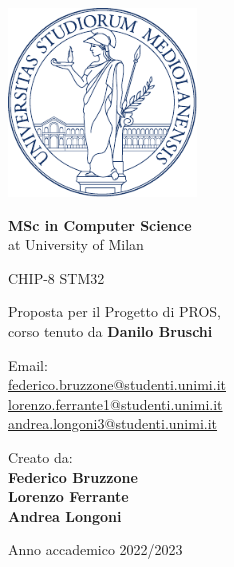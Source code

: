 \documentclass[a4paper]{article}
\begin{document}
\begin{titlepage}
	\begin{center}
		\includegraphics[height=5cm]{minerva.pdf}

		\vspace*{1.75cm}

		\LARGE

		\textbf{MSc in Computer Science} \\
		at University of Milan

		\vspace*{1cm}

		\huge
		CHIP-8 STM32

		\large Proposta per il Progetto di PROS, \\
		corso tenuto da \textbf{Danilo Bruschi}

		\normalsize
		\vspace*{4cm}

		\begin{minipage}[t]{0.47\textwidth}
			{Email: } \vspace{0.3em} \\
			{\large \href{federico.bruzzone@studenti.unimi.it}{federico.bruzzone@studenti.unimi.it}} \vspace{1em}  \\
			{\large \href{lorenzo.ferrante1@studenti.unimi.it}{lorenzo.ferrante1@studenti.unimi.it}} \vspace{1em}  \\
			{\large \href{andrea.longoni3@studenti.unimi.it}{andrea.longoni3@studenti.unimi.it}} \vspace{1em}  \\
		\end{minipage}
		\hfill
		\begin{minipage}[t]{0.47\textwidth}\raggedleft
			{Creato da:} \hspace{-0.9em} \vspace{0.3em} \\
			{\large \textbf{Federico Bruzzone}} \\
			\vspace{1em}
			{\large \textbf{Lorenzo Ferrante}} \\
			\vspace{1em}
			{\large \textbf{Andrea Longoni}}
		\end{minipage}

		\vfill
		Anno accademico 2022/2023

	\end{center}
\end{titlepage}
\end{document}
